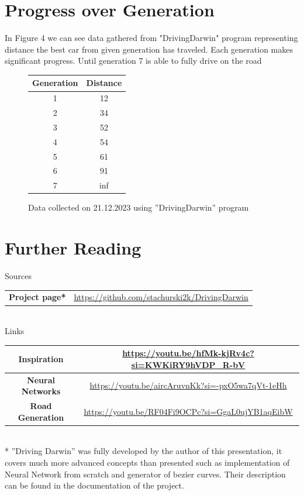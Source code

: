 \documentclass[10pt,a4paper]{article}
\begin{document}
\section{Progress over Generation}
    In Figure 4 we can see data gathered from "DrivingDarwin" program representing distance the best car from given generation has traveled. Each generation makes significant progress.
    Until generation 7 is able to fully drive on the road
\begin{figure}[!h]
    \centering
    \begin{tabular}{||c || c||}
        Generation & Distance \\
        \hline
        1  & 12\\
        \hline
        2  & 34\\
        \hline
        3  & 52\\
        \hline
        4  & 54\\
        \hline
        5 & 61\\
        \hline
        6 & 91\\
        \hline
        7 & inf\\
    \end{tabular}
\caption{\tiny{Data collected on 21.12.2023 using ”DrivingDarwin” program}} 
\end{figure}

\section{Further Reading}
\Large{Sources}\\
    \begin{tabular}{||c||c}
       \textbf{\footnotesize{Project page* }}&\footnotesize{ \url{https://github.com/stachurski2k/DrivingDarwin}}
    \end{tabular}\\
    \break \break \break
\Large{Links}\\
    \begin{tabular}{||c||c}
\textbf{\scriptsize{Inspiration}} & \scriptsize{ \url{https://youtu.be/hfMk-kjRv4c?si=KWKiRY9hVDP_R-bV}}\\
\hline
\textbf{\scriptsize{Neural Networks}} & \scriptsize{ \url{https://youtu.be/aircAruvnKk?si=-pxO5wa7qVt-1eHh}}\\
\hline
\textbf{\scriptsize{Road Generation}}& \scriptsize{ \url{https://youtu.be/RF04Fi9OCPc?si=GgaL0ujYB1aqEibW}}\\
    \end{tabular}\\
    \break \break \break
\footnotesize{
* ”Driving Darwin” was fully developed by the author of this presentation, it covers
much more advanced concepts than presented such as implementation of Neural
Network from scratch and generator of bezier curves. Their description can be found
in the documentation of the project.}
\end{document}
